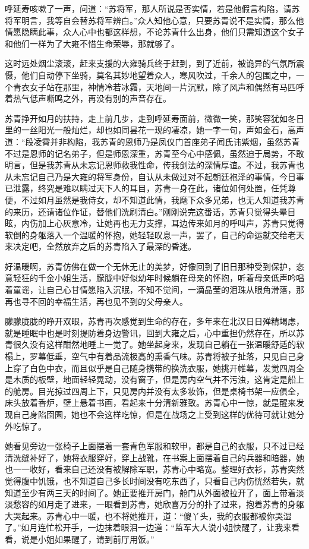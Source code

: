 呼延寿咳嗽了一声，问道：“苏将军，那人所说是否实情，若是他假言构陷，请苏将军明言，我等自会替苏将军辨白。”众人知他心意，只要苏青说不是实情，那么他情愿隐瞒此事，众人心中也都这样想，不论苏青什么出身，他们只需知道这个女子和他们一样为了大雍不惜生命荣辱，那就够了。

这时远处烟尘滚滚，赶来支援的大雍骑兵终于赶到，到了近前，被诡异的气氛所震慑，他们自动停下坐骑，莫名其妙地望着众人，寒风吹过，千余人的包围之中，一个青衣女子站在那里，神情冷若冰霜，天地间一片沉默，除了风声和偶然有马匹呼着热气低声嘶鸣之外，再没有别的声音存在。

苏青挣开如月的扶持，走上前几步，走到呼延寿面前，微微一笑，那笑容犹如冬日里的一丝阳光一般灿烂，却也如同昙花一现的凄凉，她一字一句，声如金石，高声道：“段凌霄并非构陷，我苏青的恩师乃是凤仪门首座弟子闻氏讳紫烟，虽然苏青不过是恩师的记名弟子，但是师恩深重，苏青至今心中感佩，虽然迫于局势，不敢明言，但是我苏青从未忘记恩师救我性命，传我剑法的深情厚谊。不过，我苏青也从未忘记自己乃是大雍的将军身份，自认从未做过对不起朝廷袍泽的事情，今日事已泄露，终究是难以瞒过天下人的耳目，苏青一身在此，诸位如何处置，任凭尊便，不过如月虽然是我侍女，却不知道此情，我麾下众多兄弟，也无人知道我苏青的来历，还请诸位作证，替他们洗刷清白。”刚刚说完这番话，苏青只觉得头晕目眩，内伤加上心灰意冷，让她再也无力支撑，耳边传来如月的呼叫声，苏青只觉得软倒的身躯落入一个温暖的怀抱，她轻轻叹息一声，罢了，自己的命运就交给老天来决定吧，全然放弃之后的苏青陷入了最深的昏迷。

好温暖啊，苏青仿佛在做一个无休无止的美梦，好像回到了旧日那种受到保护，恣意轻狂的千金小姐生活，朦胧中好似幼年时候躺在母亲的怀抱，听着母亲低声吟唱着童谣，让自己心甘情愿陷入沉眠，不知不觉间，一滴晶莹的泪珠从眼角滑落，那再也寻不回的幸福生活，再也见不到的父母亲人。

朦朦胧胧的睁开双眼，苏青再次感觉到生命的存在，多年来在北汉日日殚精竭虑，就是睡眠中也是时刻提防着身边警讯，回到大雍之后，心中重担仍然存在，所以苏青很久没有这样酣然地睡上一觉了。她坐起身来，发现自己躺在一张温暖舒适的软榻上，罗幕低垂，空气中有着品流极高的熏香气味。苏青将被子扯落，只见自己身上穿了白色中衣，而且似乎是自己随身携带的换洗衣服，她挑开帷幕，发觉四周全是木质的板壁，地面轻轻晃动，没有窗子，但是房内空气并不污浊，这肯定是船上的舱房。目光掠过四周上下，只见房内并没有太多妆饰，但是桌椅书架一应俱全，床头放着香炉，壁上悬着书画，看起来十分清新雅致。苏青心中一惊，就是醒来发现自己身陷囹圄，她也不会这样吃惊，但是在战场之上受到这样的优待可就让她分外吃惊了。

她看见旁边一张椅子上面摆着一套青色军服和软甲，都是自己的衣服，只不过已经清洗缝补好了，她将衣服穿好，穿上战靴，在书案上面摆着自己的兵器和暗器，她也一一收好，看来自己还没有被解除军职，苏青心中略宽。整理好衣衫，苏青突然觉得腹中饥饿，也不知道自己多长时间没有吃东西了，只看自己内伤恍然若失，就知道至少有两三天的时间了。她正要推开房门，舱门从外面被拉开了，面上带着淡淡愁容的如月走了进来，一眼看到苏青，她欣喜万分的扑了过来，抱着苏青的身躯大哭起来。苏青心中一暖，也不将她推开，道：“傻丫头，我的衣服都被你哭湿了。”如月连忙松开手，一边抹着眼泪一边道：“监军大人说小姐快醒了，让我来看看，说是小姐如果醒了，请到前厅用饭。”

